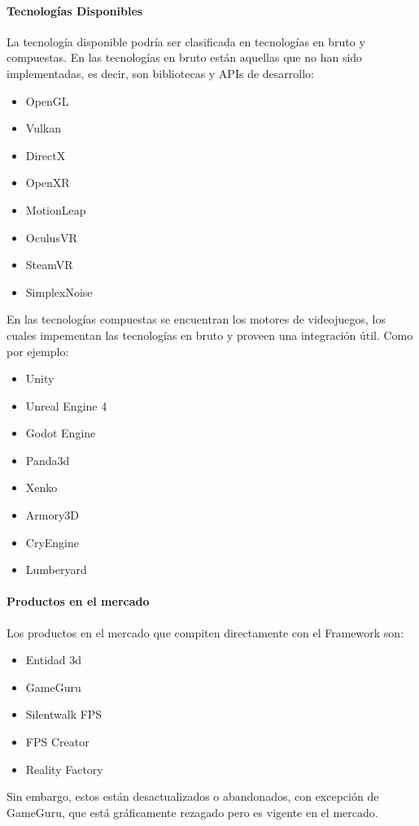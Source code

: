 \documentclass[]{article}
\begin{document}
\paragraph{Tecnolog\'ias Disponibles}
La tecnolog\'ia disponible podr\'ia ser clasificada en tecnolog\'ias en bruto y compuestas. En las tecnolog\'ias en bruto est\'an aquellas que no han sido implementadas, es decir, son bibliotecas y APIs de desarrollo: 
\begin{itemize}
	\item OpenGL
	\item Vulkan
	\item DirectX
	\item OpenXR
	\item MotionLeap
	\item OculusVR
	\item SteamVR
	\item SimplexNoise
\end{itemize}
En las tecnolog\'ias compuestas se encuentran los motores de videojuegos, los cuales impementan las tecnolog\'ias en bruto y proveen una integraci\'on \'util.
Como por ejemplo: 
\begin{itemize}
	\item Unity
	\item Unreal Engine 4
	\item Godot Engine
	\item Panda3d
	\item Xenko
	\item Armory3D
	\item CryEngine
	\item Lumberyard
\end{itemize}

\paragraph{Productos en el mercado}
Los productos en el mercado que compiten directamente con el Framework son: 
\begin{itemize}
	\item Entidad 3d
	\item GameGuru
	\item Silentwalk FPS 
	\item FPS Creator
	\item Reality Factory
	
\end{itemize}
Sin embargo, estos est\'an desactualizados o abandonados, con excepci\'on de GameGuru, que est\'a gr\'aficamente rezagado pero es vigente en el mercado. 
\end{document}
